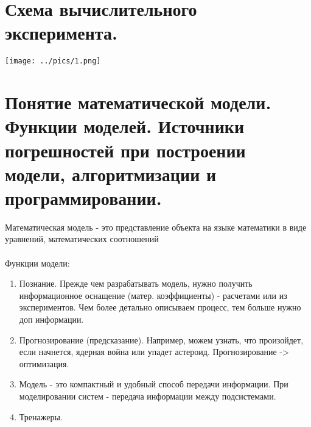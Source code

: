 \documentclass[12pt,a4paper]{article}
\begin{document}
	\section{Схема вычислительного эксперимента. }
	\texttt{[image: ../pics/1.png]}	
	
	\section{Понятие математической модели. Функции моделей. Источники погрешностей при построении модели, алгоритмизации и программировании.}
	
	Математическая модель - это представление объекта на языке математики в виде уравнений, математических соотношений\\\\	
	Функции модели:
	\begin{enumerate}
		\item Познание. Прежде чем разрабатывать модель, нужно получить информационное оснащение (матер. коэффициенты) - расчетами или из экспериментов. Чем более детально описываем процесс, тем больше нужно доп информации. 
		\item Прогнозирование (предсказание). Например, можем узнать, что произойдет, если начнется, ядерная война или упадет астероид. Прогнозирование -> оптимизация.
		\item Модель - это компактный и удобный способ передачи информации. При моделировании систем - передача информации между подсистемами. 
		\item Тренажеры. 
	\end{enumerate}
\end{document}

